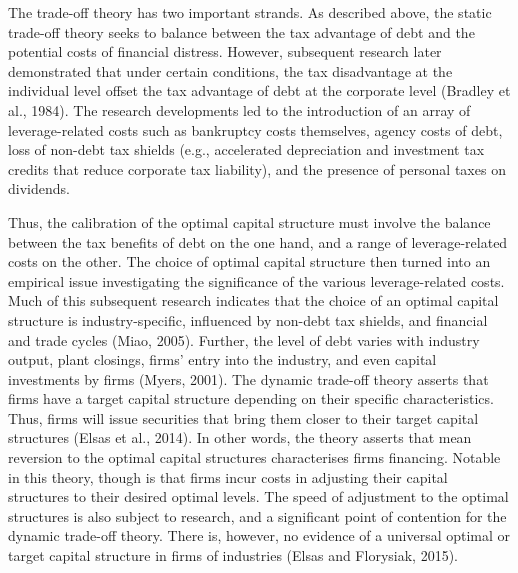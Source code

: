 \documentclass[a4paper, nobind]{templates/ociamthesis}
\begin{document}
The trade-off theory has two important strands. As described above, the static trade-off theory seeks to balance between the tax advantage of debt and the potential costs of financial distress. However, subsequent research later demonstrated that under certain conditions, the tax disadvantage at the individual level offset the tax advantage of debt at the corporate level (Bradley et al., 1984). The research developments led to the introduction of an array of leverage-related costs such as bankruptcy costs themselves, agency costs of debt, loss of non-debt tax shields (e.g., accelerated depreciation and investment tax credits that reduce corporate tax liability), and the presence of personal taxes on dividends.

Thus, the calibration of the optimal capital structure must involve the balance between the tax benefits of debt on the one hand, and a range of leverage-related costs on the other. The choice of optimal capital structure then turned into an empirical issue investigating the significance of the various leverage-related costs. Much of this subsequent research indicates that the choice of an optimal capital structure is industry-specific, influenced by non-debt tax shields, and financial and trade cycles (Miao, 2005). Further, the level of debt varies with industry output, plant closings, firms' entry into the industry, and even capital investments by firms (Myers, 2001).
The dynamic trade-off theory asserts that firms have a target capital structure depending on their specific characteristics. Thus, firms will issue securities that bring them closer to their target capital structures (Elsas et al., 2014). In other words, the theory asserts that mean reversion to the optimal capital structures characterises firms financing. Notable in this theory, though is that firms incur costs in adjusting their capital structures to their desired optimal levels. The speed of adjustment to the optimal structures is also subject to research, and a significant point of contention for the dynamic trade-off theory. There is, however, no evidence of a universal optimal or target capital structure in firms of industries (Elsas and Florysiak, 2015).
\end{document}
